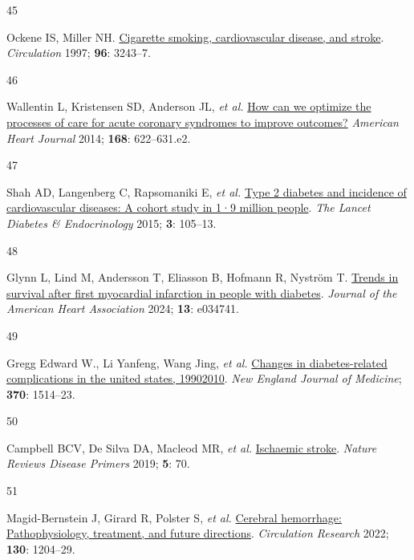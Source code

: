 \documentclass[
  a4paper,
  headsepline=true,
  open=left]{scrbook}
\newlength{\cslhangindent}
\newlength{\csllabelwidth}
\newlength{\cslentryspacingunit} %
\newenvironment{CSLReferences}[2] %
 {%
  \setlength{\parindent}{0pt}
  \ifodd #1
  \let\oldpar\par
  \def\par{\hangindent=\cslhangindent\oldpar}
  \fi
  \setlength{\parskip}{#2\cslentryspacingunit}
 }%
 {}
\newcommand{\CSLLeftMargin}[1]{\parbox[t]{\csllabelwidth}{#1}}
\newcommand{\CSLRightInline}[1]{\parbox[t]{\linewidth - \csllabelwidth}{#1}\break}
\begin{document}
\begin{CSLReferences}{0}{0}
\leavevmode{}%
\CSLLeftMargin{45 }%
\CSLRightInline{Ockene IS, Miller NH.
\href{https://doi.org/10.1161/01.CIR.96.9.3243}{Cigarette smoking,
cardiovascular disease, and stroke}. \emph{Circulation} 1997;
\textbf{96}: 3243--7.}

\leavevmode{}%
\CSLLeftMargin{46 }%
\CSLRightInline{Wallentin L, Kristensen SD, Anderson JL, \emph{et al.}
\href{https://doi.org/10.1016/j.ahj.2014.07.006}{How can we optimize the
processes of care for acute coronary syndromes to improve outcomes?}
\emph{American Heart Journal} 2014; \textbf{168}: 622--631.e2.}

\leavevmode{}%
\CSLLeftMargin{47 }%
\CSLRightInline{Shah AD, Langenberg C, Rapsomaniki E, \emph{et al.}
\href{https://doi.org/10.1016/S2213-8587(14)70219-0}{Type 2 diabetes and
incidence of cardiovascular diseases: A cohort study in 1·9 million
people}. \emph{The Lancet Diabetes \& Endocrinology} 2015; \textbf{3}:
105--13.}

\leavevmode{}%
\CSLLeftMargin{48 }%
\CSLRightInline{Glynn L, Lind M, Andersson T, Eliasson B, Hofmann R,
Nyström T. \href{https://doi.org/10.1161/JAHA.123.034741}{Trends in
survival after first myocardial infarction in people with diabetes}.
\emph{Journal of the American Heart Association} 2024; \textbf{13}:
e034741.}

\leavevmode{}%
\CSLLeftMargin{49 }%
\CSLRightInline{Gregg Edward W., Li Yanfeng, Wang Jing, \emph{et al.}
\href{https://doi.org/10.1056/NEJMoa1310799}{Changes in diabetes-related
complications in the united states, 1990{\textendash}2010}. \emph{New
England Journal of Medicine}; \textbf{370}: 1514--23.}

\leavevmode{}%
\CSLLeftMargin{50 }%
\CSLRightInline{Campbell BCV, De Silva DA, Macleod MR, \emph{et al.}
\href{https://doi.org/10.1038/s41572-019-0118-8}{Ischaemic stroke}.
\emph{Nature Reviews Disease Primers} 2019; \textbf{5}: 70.}

\leavevmode{}%
\CSLLeftMargin{51 }%
\CSLRightInline{Magid-Bernstein J, Girard R, Polster S, \emph{et al.}
\href{https://doi.org/10.1161/CIRCRESAHA.121.319949}{Cerebral
hemorrhage: Pathophysiology, treatment, and future directions}.
\emph{Circulation Research} 2022; \textbf{130}: 1204--29.}


\end{CSLReferences}
\end{document}
